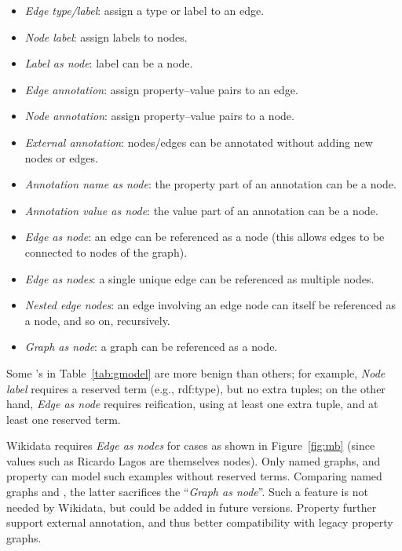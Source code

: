 \begin{itemize}
\item \textit{Edge type/label}: assign a type or label to an edge.
\item \textit{Node label}: assign labels to nodes.
\item \textit{Label as node}: label can be a node.
\item \textit{Edge annotation}: assign property--value pairs to an edge.
\item \textit{Node annotation}: assign property--value pairs to a node.
\item \textit{External annotation}: nodes/edges can be annotated without adding new nodes or edges.
\item \textit{Annotation name as node}: the property part of an annotation can be a node.
\item \textit{Annotation value as node}: the value part of an annotation can be a node.
\item \textit{Edge as node}: an edge can be referenced as a node (this allows edges to be connected to nodes of the graph).
\item \textit{Edge as nodes}: a single unique edge can be referenced as multiple nodes.
\item \textit{Nested edge nodes}: an edge involving an edge node can itself be referenced as a node, and so on, recursively.
\item \textit{Graph as node}: a graph can be referenced as a node.
\end{itemize}

Some \nmark's in Table~\ref{tab:gmodel} are more benign than others; for example, \textit{Node label} requires a reserved term (e.g., \textsf{rdf:type}), but no extra tuples; on the other hand, \textit{Edge as node} requires reification, using at least one extra tuple, and at least one reserved term.

Wikidata requires \textit{Edge as nodes} for cases as shown in Figure~\ref{fig:mb} (since values such as \textsf{Ricardo Lagos} are themselves nodes). Only named graphs, \datas and property \datas can model such examples without reserved terms. Comparing named graphs and \datas, the latter sacrifices the ``\textit{Graph as node}''. Such a feature is not needed by Wikidata, but could be added in future versions. Property \datas further support external annotation, and thus better compatibility with legacy property graphs.



